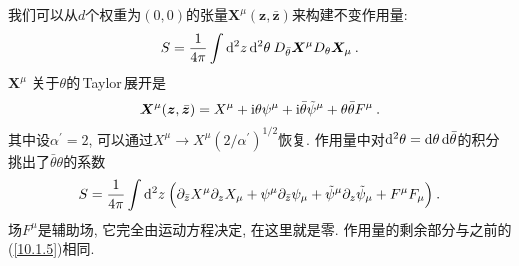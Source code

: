我们可以从$ d $个权重为$ (0,0) $的张量$ \bm{X}^{\mu}(\bm{z},\bar{\bm{z}}) $来构建不变作用量:
\begin{equation}
    S= \frac{1}{4\pi} \int \mathrm{d}^{2}z\,\mathrm{d}^{2}\theta\: D_{\bar{\theta}}\bm{X}^{\mu}D_{\theta}\bm{X}_{\mu}\:.\label{12.3.18} 
\end{equation}
$\bm{X}^{\mu}$ 关于$ \theta $的\,Taylor\,展开是
\begin{equation}
    \bm{X}^{\mu}(\bm{z},\bar{\bm{z}})=X^{\mu}+\mathrm{i}\theta \psi^{\mu}+\mathrm{i}\bar{\theta}\tilde{\psi}^{\mu}
    +\theta\bar{\theta}F^{\mu} \:. \label{12.3.19}
\end{equation}
其中设$ \alpha^{\prime}=2$, 可以通过$ X^{\mu}\to X^{\mu}(2/\alpha^{\prime})^{1/2} $恢复. 作用量中对$ \mathrm{d}^{2}\theta=\mathrm{d}\theta\,\mathrm{d}\bar{\theta} $的积分挑出了$ \bar{\theta}\theta $的系数
\begin{equation}
    S=\frac{1}{4\pi}\int\mathrm{d}^{2}z\:\Bigl(\partial_{\bar{z}}X^{\mu}\partial_{z}X_{\mu}+\psi^{\mu}\partial_{\bar{z}}\psi_{\mu}+\tilde{\psi}^{\mu}\partial_{z}\tilde{\psi}_{\mu}+F^{\mu}F_{\mu}\Bigr) \:. \label{12.3.20}
\end{equation}
场$ F^{\mu} $是辅助场, 它完全由运动方程决定, 在这里就是零. 作用量的剩余部分与之前的(\ref{10.1.5})相同.

